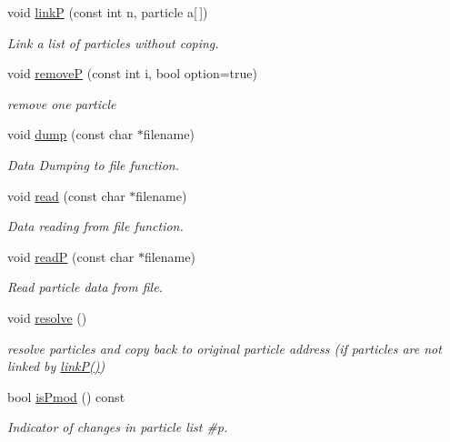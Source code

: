 \begin{DoxyCompactItemize}
void \hyperlink{classARC_1_1chain_a8e3a7952b6364eb5730004d50ac5eb4c}{linkP} (const int n, particle a\mbox{[}$\,$\mbox{]})
\begin{DoxyCompactList}\small\item\em Link a list of particles without coping. \end{DoxyCompactList}\item 
void \hyperlink{classARC_1_1chain_a8ba21a4be849607692d73e846802a287}{removeP} (const int i, bool option=true)
\begin{DoxyCompactList}\small\item\em remove one particle \end{DoxyCompactList}\item 
void \hyperlink{classARC_1_1chain_a6caef2b2dc81cc944377a3ea511c0fe8}{dump} (const char $\ast$filename)
\begin{DoxyCompactList}\small\item\em Data Dumping to file function. \end{DoxyCompactList}\item 
void \hyperlink{classARC_1_1chain_a3f328bce3650bab9496987bc5a1f5a98}{read} (const char $\ast$filename)
\begin{DoxyCompactList}\small\item\em Data reading from file function. \end{DoxyCompactList}\item 
void \hyperlink{classARC_1_1chain_a5325cc6945e9992b431450f7846e91e5}{readP} (const char $\ast$filename)
\begin{DoxyCompactList}\small\item\em Read particle data from file. \end{DoxyCompactList}\item 
void \hyperlink{classARC_1_1chain_a4f6a1518c7c788a9ef3d12dd8e5aec7a}{resolve} ()
\begin{DoxyCompactList}\small\item\em resolve particles and copy back to original particle address (if particles are not linked by \hyperlink{classARC_1_1chain_a8e3a7952b6364eb5730004d50ac5eb4c}{link\+P()}) \end{DoxyCompactList}\item 
bool \hyperlink{classARC_1_1chain_a22fd005339b734ba2973ba47bf5ddc62}{is\+Pmod} () const
\begin{DoxyCompactList}\small\item\em Indicator of changes in particle list \#p. \end{DoxyCompactList}\item 

\end{DoxyCompactItemize}
